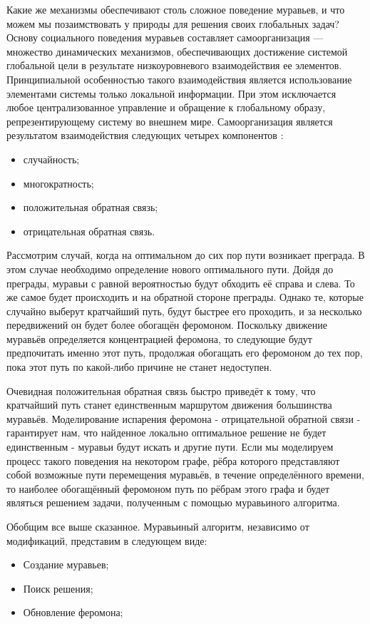\documentclass[12pt]{report}
\begin{document}
Какие же механизмы обеспечивают столь сложное поведение муравьев, и что можем мы позаимствовать у природы для решения своих глобальных задач? Основу социального поведения муравьев составляет самоорганизация — множество динамических механизмов, обеспечивающих достижение системой глобальной цели в результате низкоуровневого взаимодействия ее элементов. Принципиальной особенностью такого взаимодействия является использование элементами системы только локальной информации. При этом исключается любое централизованное управление и обращение к глобальному образу, репрезентирующему систему во внешнем мире. Самоорганизация является результатом взаимодействия следующих четырех компонентов \cite{ant2} :
	\begin{itemize}
	\item случайность;
	\item многократность;
	\item положительная обратная связь;
	\item отрицательная обратная связь.
	\end{itemize}

Рассмотрим случай, когда на оптимальном до сих пор пути возникает преграда. В этом случае необходимо определение нового оптимального пути. Дойдя до преграды, муравьи с равной вероятностью будут обходить её справа и слева. То же самое будет происходить и на обратной стороне преграды. Однако те, которые случайно выберут кратчайший путь, будут быстрее его проходить, и за несколько передвижений он будет более обогащён феромоном. Поскольку движение муравьёв определяется концентрацией феромона, то следующие будут предпочитать именно этот путь, продолжая обогащать его феромоном до тех пор, пока этот путь по какой-либо причине не станет недоступен.

Очевидная положительная обратная связь быстро приведёт к тому, что кратчайший путь станет единственным маршрутом движения большинства муравьёв. Моделирование испарения феромона - отрицательной обратной связи - гарантирует нам, что найденное локально оптимальное решение не будет единственным - муравьи будут искать и другие пути. Если мы моделируем процесс такого поведения на некотором графе, рёбра которого представляют собой возможные пути перемещения муравьёв, в течение определённого времени, то наиболее обогащённый феромоном путь по рёбрам этого графа и будет являться решением задачи, полученным с помощью муравьиного алгоритма.

Обобщим все выше сказанное. Муравьиный алгоритм, независимо от модификаций, представим в следующем виде:
\begin{itemize}
	\item Создание муравьев;
	\item Поиск решения;
	\item Обновление феромона;
\end{itemize}
\end{document}
